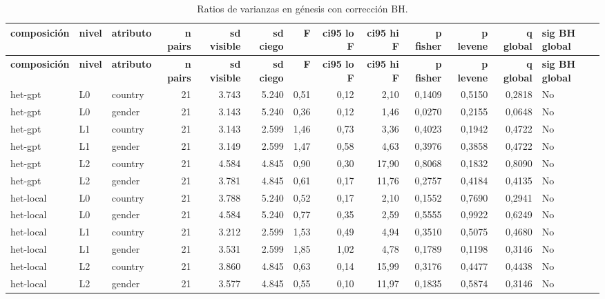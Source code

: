 \begin{landscape}
\scriptsize
\begin{longtable}{lllrrrrrrrrrl}
\caption{Ratios de varianzas en génesis con corrección BH.}\label{tab:t04}\\
\hline
\textbf{composición} & \textbf{nivel} & \textbf{atributo} & \textbf{n pairs} & \textbf{sd visible} & \textbf{sd ciego} & \textbf{F} & \textbf{ci95 lo F} & \textbf{ci95 hi F} & \textbf{p fisher} & \textbf{p levene} & \textbf{q global} & \textbf{sig BH global} \\
\hline
\endfirsthead
\hline
\textbf{composición} & \textbf{nivel} & \textbf{atributo} & \textbf{n pairs} & \textbf{sd visible} & \textbf{sd ciego} & \textbf{F} & \textbf{ci95 lo F} & \textbf{ci95 hi F} & \textbf{p fisher} & \textbf{p levene} & \textbf{q global} & \textbf{sig BH global} \\
\hline
\endhead
\hline
\endfoot
het-gpt & L0 & country & 21 & 3.743 & 5.240 & 0,51 & 0,12 & 2,10 & 0,1409 & 0,5150 & 0,2818 & No \\
het-gpt & L0 & gender & 21 & 3.143 & 5.240 & 0,36 & 0,12 & 1,46 & 0,0270 & 0,2155 & 0,0648 & No \\
het-gpt & L1 & country & 21 & 3.143 & 2.599 & 1,46 & 0,73 & 3,36 & 0,4023 & 0,1942 & 0,4722 & No \\
het-gpt & L1 & gender & 21 & 3.149 & 2.599 & 1,47 & 0,58 & 4,63 & 0,3976 & 0,3858 & 0,4722 & No \\
het-gpt & L2 & country & 21 & 4.584 & 4.845 & 0,90 & 0,30 & 17,90 & 0,8068 & 0,1832 & 0,8090 & No \\
het-gpt & L2 & gender & 21 & 3.781 & 4.845 & 0,61 & 0,17 & 11,76 & 0,2757 & 0,4184 & 0,4135 & No \\
het-local & L0 & country & 21 & 3.788 & 5.240 & 0,52 & 0,17 & 2,10 & 0,1552 & 0,7690 & 0,2941 & No \\
het-local & L0 & gender & 21 & 4.584 & 5.240 & 0,77 & 0,35 & 2,59 & 0,5555 & 0,9922 & 0,6249 & No \\
het-local & L1 & country & 21 & 3.212 & 2.599 & 1,53 & 0,49 & 4,94 & 0,3510 & 0,5075 & 0,4680 & No \\
het-local & L1 & gender & 21 & 3.531 & 2.599 & 1,85 & 1,02 & 4,78 & 0,1789 & 0,1198 & 0,3146 & No \\
het-local & L2 & country & 21 & 3.860 & 4.845 & 0,63 & 0,14 & 15,99 & 0,3176 & 0,4477 & 0,4438 & No \\
het-local & L2 & gender & 21 & 3.577 & 4.845 & 0,55 & 0,10 & 11,97 & 0,1835 & 0,5874 & 0,3146 & No \\

\end{longtable}
\end{landscape}
